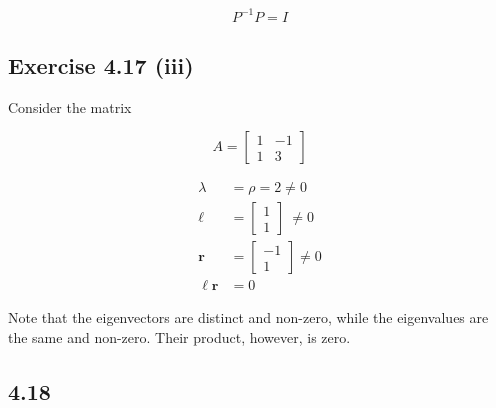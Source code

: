 \documentclass[letterpaper,12pt]{article}
\theoremstyle{definition}
\begin{document}
\[P^{-1}     P = I \]

\subsection*{Exercise 4.17 (iii)}

Consider the matrix 

\[A = \begin{bmatrix}
1 & -1\\
1 & 3
\end{bmatrix}\]

\begin{align*}
\lambda &= \rho = 2 \neq 0\\
\mathbf{\ell} &= \begin{bmatrix}
1\\
1
\end{bmatrix} \ \neq 0\\
\mathbf{r} &= \begin{bmatrix}
-1\\
1
\end{bmatrix} \neq 0 \\
\mathbf{\ell r} &= 0
\end{align*}

Note that the eigenvectors are distinct and non-zero, while the eigenvalues are the same and non-zero. Their product, however, is zero.


\subsection*{4.18}
\end{document}
